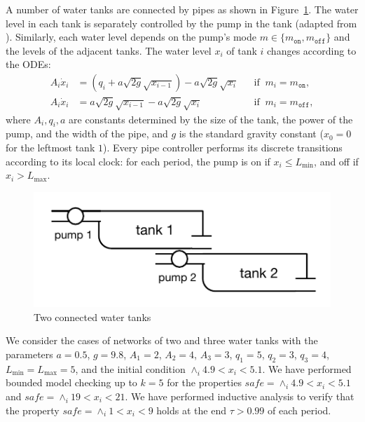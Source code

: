 A number of water tanks are connected by pipes as shown in Figure~\ref{fig:water}.
The water level in each tank is separately controlled by the pump in the tank
(adapted from \cite{kowalewski1999case,raisch1999approximating}).
Similarly, each water level depends on the pump's mode $m \in \{m_\texttt{on}, m_\texttt{off}\}$
and the levels of the adjacent tanks.
The water level $x_i$ of tank $i$ changes according to the ODEs:
\[
\begin{aligned}
A_i \dot{x}_i &=  (q_i + a \sqrt{2g} \sqrt{x_{i-1}})  - a \sqrt{2g} \sqrt{x_i}
&& \mbox{if}\;\; m_i = m_\texttt{on},
\\
A_i \dot{x}_i &= a \sqrt{2g} \sqrt{x_{i-1}}  - a \sqrt{2g} \sqrt{x_i}
&& \mbox{if}\;\; m_i = m_\texttt{off},
\end{aligned}
\]
where $A_i, q_i, a $ are constants determined by the size of the tank, the power of the pump, 
and the width of the pipe,
and $g$ is the standard gravity constant ($x_0 = 0$ for the leftmost tank $1$).
%
Every pipe controller performs its discrete transitions according to its local clock:
for each period, 
the pump is on if $x_i \leq L_{\min}$, and off if $x_i > L_{\max}$.

\begin{figure}
\centering
\includegraphics[clip=true,trim=0.3cm 0.35cm 0.3cm 0.35cm,width=0.6\columnwidth]{water.pdf}    
\caption{Two connected water tanks}  \label{fig:water}
\end{figure}



We consider the cases of networks of two and three water tanks
with the parameters
$a = 0.5$,
$g = 9.8$,
$A_1 = 2$, 
$A_2 = 4$, 
$A_3 = 3$, 
$q_1 = 5$,
$q_2 = 3$,
$q_3 = 4$,
$L_{\min} = L_{\max} = 5$,
and the initial condition $\wedge_{i} 4.9 < x_i < 5.1$.
We have performed bounded model checking up to $k = 5$
for the properties $\mathit{safe} = \wedge_{i} 4.9 < x_i < 5.1$ 
and $\mathit{safe} = \wedge_{i} 19 < x_i < 21$.
We have performed 
inductive analysis 
to verify that the property $\mathit{safe} = \wedge_{i} 1 < x_i < 9$
holds at the end $\tau > 0.99$ of each period.





